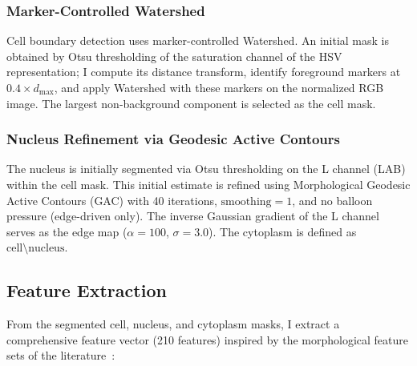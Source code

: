 \documentclass[twocolumn,a4paper]{article}
\begin{document}
\subsubsection{Marker-Controlled Watershed}

Cell boundary detection uses marker-controlled Watershed. An initial mask is obtained by Otsu thresholding of the saturation channel of the HSV representation; I compute its distance transform, identify foreground markers at $0.4 \times d_{\max}$, and apply Watershed with these markers on the normalized RGB image. The largest non-background component is selected as the cell mask.

\subsubsection{Nucleus Refinement via Geodesic Active Contours}

The nucleus is initially segmented via Otsu thresholding on the L channel (LAB) within the cell mask. This initial estimate is refined using Morphological Geodesic Active Contours (GAC) with 40 iterations, $\text{smoothing}=1$, and no balloon pressure (edge-driven only). The inverse Gaussian gradient of the L channel serves as the edge map ($\alpha=100$, $\sigma=3.0$). The cytoplasm is defined as $\text{cell} \setminus \text{nucleus}$.

\subsection{Feature Extraction}

From the segmented cell, nucleus, and cytoplasm masks, I extract a comprehensive feature vector (210 features) inspired by the morphological feature sets of the literature~\cite{gautam2014, aldulaimi2018}:
\end{document}
